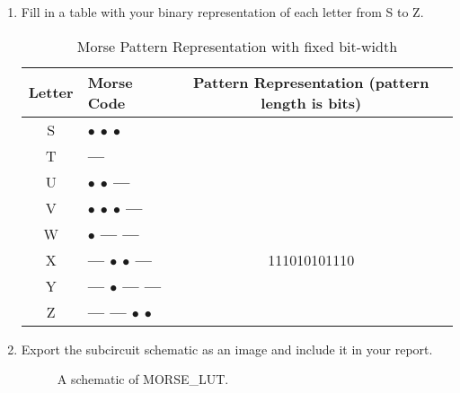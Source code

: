 \documentclass{article}
\begin{document}
\begin{enumerate}
\item Fill in a table with your binary representation of each letter from S to Z.

\begin{table}[ht!]
\centering
\begin{tabular}{|c|l|c|} \hline
    \textbf{Letter} & \textbf{Morse Code} & \textbf{Pattern Representation (pattern length is \underline{\hspace{1cm}} bits)} \\ \hline

    S & \textbf{$\bullet$ $\bullet$ $\bullet$} & \hspace{2cm} \\ \hline
    T & \textbf{---} & \\ \hline
    U & \textbf{$\bullet$ $\bullet$ --- } & \\ \hline
    V & \textbf{$\bullet$ $\bullet$ $\bullet$ --- } & \\ \hline
    W & \textbf{$\bullet$ --- ---} & \\ \hline
    X & \textbf{--- $\bullet$ $\bullet$ ---} & 111010101110\\ \hline
    Y & \textbf{--- $\bullet$ --- ---} & \\ \hline
    Z & \textbf{--- --- $\bullet$ $\bullet$} & \\ \hline

\end{tabular}
\caption{Morse Pattern Representation with fixed bit-width}
\label{tab:morse:pattern}
\end{table}

\item Export the subcircuit schematic as an image and include it in your report.

\begin{figure}[ht!]
    \centering
    \caption{A schematic of MORSE\_LUT.}
    \label{f:morse_lut}
\end{figure}
\end{enumerate}
\end{document}
